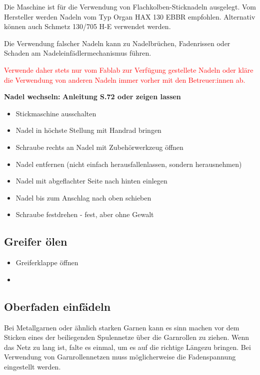 \documentclass{\basedir/fablab-document}
\begin{document}
Die Maschine ist für die Verwendung von Flachkolben-Sticknadeln ausgelegt. Vom Hersteller werden Nadeln vom Typ Organ HAX 130 EBBR empfohlen. Alternativ können auch Schmetz 130/705 H-E verwendet werden. 
 
Die Verwendung falscher Nadeln kann zu Nadelbrüchen, Fadenrissen oder Schaden am Nadeleinfädlermechanismus führen.

\textcolor{red}{Verwende daher stets nur vom Fablab zur Verfügung gestellete Nadeln oder kläre die Verwendung von anderen Nadeln immer vorher mit den Betreuer:innen ab.}

\vspace{2em}

\textbf{Nadel wechseln:}
\newline \textbf{Anleitung S.72 oder zeigen lassen}
\begin{itemize}
	\item Stickmaschine ausschalten
	\item Nadel in höchste Stellung mit Handrad bringen
	\item Schraube rechts an Nadel mit Zubehörwerkzeug öffnen
	\item Nadel entfernen (nicht einfach herausfallenlassen, sondern herausnehmen)
	\item Nadel mit abgeflachter Seite nach hinten einlegen
	\item Nadel bis zum Anschlag nach oben schieben
	\item Schraube festdrehen -  fest, aber ohne Gewalt
	
\end{itemize}

\subsection{Greifer ölen}
\label{sec:oelen}
\begin{itemize}
	\item Greiferklappe öffnen
	\item 
\end{itemize}

\vspace{2em}

\subsection{Oberfaden einfädeln}

Bei Metallgarnen oder ähnlich starken Garnen kann es sinn machen vor dem Sticken eines der beiliegenden Spulennetze über die Garnrollen zu ziehen. Wenn das Netz zu lang ist, falte es einmal, um es auf die richtige Längezu bringen.
Bei Verwendung von Garnrollennetzen muss möglicherweise die Fadenspannung eingestellt werden.
\end{document}
